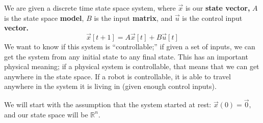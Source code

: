 

We are given a discrete time state space system, where $\vec{x}$ is our \textbf{state vector,} $A$ is the state space \textbf{model}, $B$ is the input \textbf{matrix}, and $\vec{u}$ is the control input \textbf{vector.}
\begin{equation}
\vec{x}[t + 1] = A \vec{x}[t] + B\vec{u}[t]
\end{equation}
We want to know if this system is “controllable;” if given a set of inputs, we can get the system from any initial state to any final state. This has an important physical meaning; if a physical system is controllable, that means that we can get anywhere in the state space. If a robot is controllable, it is able to travel anywhere in the system it is living in (given enough control inputs).

We will start with the assumption that the system started at rest: $\vec{x}(0) = \vec{0},$ and our state space will be $\mathbb{R}^{n}.$


